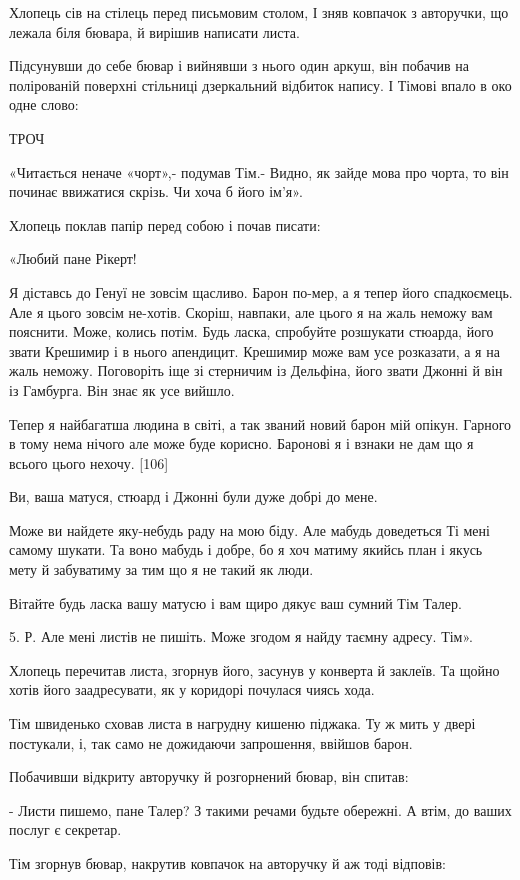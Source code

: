 Хлопець сів на стілець перед письмовим столом, І зняв ковпачок з авторучки, що лежала біля бювара, й вирішив написати листа.

Підсунувши до себе бювар і вийнявши з нього один аркуш, він побачив на полірованій поверхні стільниці дзеркальний відбиток напису. І Тімові впало в око одне слово:

ТРОЧ

«Читається неначе «чорт»,- подумав Тім.- Видно, як зайде мова про чорта, то він починає ввижатися скрізь. Чи хоча б його ім'я».

Хлопець поклав папір перед собою і почав писати:

«Любий пане Рікерт!

Я діставсь до Генуї не зовсім щасливо. Барон по-мер, а я тепер його спадкоємець. Але я цього зовсім не-хотів. Скоріш, навпаки, але цього я на жаль неможу вам пояснити. Може, колись потім. Будь ласка, спробуйте розшукати стюарда, його звати Крешимир і в нього апендицит. Крешимир може вам усе розказати, а я на жаль неможу. Поговоріть іще зі стерничим із Дельфіна, його звати Джонні й він із Гамбурга. Він знає як усе вийшло.

Тепер я найбагатша людина в світі, а так званий новий барон мій опікун. Гарного в тому нема нічого але може буде корисно. Баронові я і взнаки не дам що я всього цього нехочу. [106]

Ви, ваша матуся, стюард і Джонні були дуже добрі до мене.

Може ви найдете яку-небудь раду на мою біду. Але мабудь доведеться Ті мені самому шукати. Та воно мабудь і добре, бо я хоч матиму якийсь план і якусь мету й забуватиму за тим що я не такий як люди.

Вітайте будь ласка вашу матусю і вам щиро дякує ваш сумний Тім Талер.

5. Р. Але мені листів не пишіть. Може згодом я найду таємну адресу. Тім».

Хлопець перечитав листа, згорнув його, засунув у конверта й заклеїв. Та щойно хотів його заадресувати, як у коридорі почулася чиясь хода.

Тім швиденько сховав листа в нагрудну кишеню піджака. Ту ж мить у двері постукали, і, так само не дожидаючи запрошення, ввійшов барон.

Побачивши відкриту авторучку й розгорнений бювар, він спитав:

- Листи пишемо, пане Талер? З такими речами будьте обережні. А втім, до ваших послуг є секретар.

Тім згорнув бювар, накрутив ковпачок на авторучку й аж тоді відповів:

